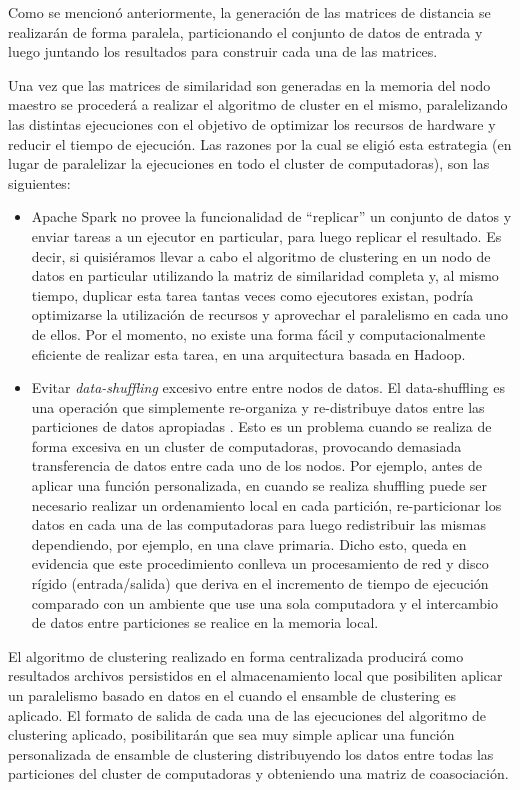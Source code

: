 \bigskip Como se mencionó anteriormente, la generación de las matrices de distancia se realizarán de forma paralela, particionando el conjunto de datos de entrada y luego juntando los resultados para construir cada una de las matrices.

\bigskip Una vez que las matrices de similaridad son generadas en la memoria del nodo maestro se procederá a realizar el algoritmo de cluster en el mismo, paralelizando las distintas ejecuciones con el objetivo de optimizar los recursos de hardware y reducir el tiempo de ejecución. Las razones por la cual se eligió esta estrategia (en lugar de paralelizar la ejecuciones en todo el cluster de computadoras), son las siguientes:

\begin{itemize}
	\item Apache Spark no provee la funcionalidad de “replicar” un conjunto de datos y enviar tareas a un ejecutor en particular, para luego replicar el resultado. Es decir, si quisiéramos llevar a cabo el algoritmo de clustering en un nodo de datos en particular utilizando la matriz de similaridad completa y, al mismo tiempo, duplicar esta tarea tantas veces como ejecutores existan, podría optimizarse la utilización de recursos y aprovechar el paralelismo en cada uno de ellos. Por el momento, no existe una forma fácil y computacionalmente eficiente de realizar esta tarea, en una arquitectura basada en Hadoop.
	\item Evitar \textit{data-shuffling} excesivo entre entre nodos de datos. El data-shuffling es una operación que simplemente re-organiza y re-distribuye datos entre las particiones de datos apropiadas \citep{zhang2012optimizing}. Esto es un problema cuando se realiza de forma excesiva en un cluster de computadoras, provocando demasiada transferencia de datos entre cada uno de los nodos. Por ejemplo, antes de aplicar una función personalizada, en cuando se realiza shuffling puede ser necesario realizar un ordenamiento local en cada partición, re-particionar los datos en cada una de las computadoras para luego redistribuir las mismas dependiendo, por ejemplo, en una clave primaria. Dicho esto, queda en evidencia que este procedimiento conlleva un procesamiento de red y disco rígido (entrada/salida) que deriva en el incremento de tiempo de ejecución comparado con un ambiente que use una sola computadora y el intercambio de datos entre particiones se realice en la memoria local.
\end{itemize}

El algoritmo de clustering realizado en forma centralizada producirá como resultados archivos persistidos en el almacenamiento local que posibiliten aplicar un paralelismo basado en datos en el cuando el ensamble de clustering es aplicado. El formato de salida de cada una de las ejecuciones del algoritmo de clustering aplicado, posibilitarán que sea muy simple aplicar una función personalizada de ensamble de clustering distribuyendo los datos entre todas las particiones del cluster de computadoras y obteniendo una matriz de coasociación.

